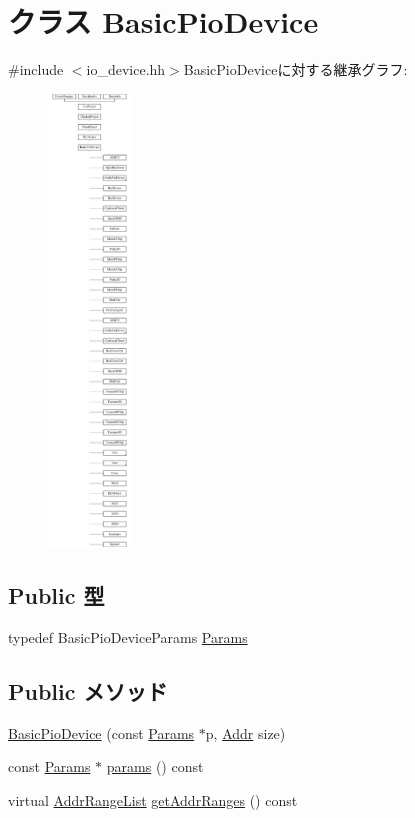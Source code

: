 \hypertarget{classBasicPioDevice}{
\section{クラス BasicPioDevice}
\label{classBasicPioDevice}
}


{\ttfamily \#include $<$io\_\-device.hh$>$}BasicPioDeviceに対する継承グラフ:\begin{figure}[H]
\begin{center}
\leavevmode
\includegraphics[height=12cm]{classBasicPioDevice}
\end{center}
\end{figure}
\subsection*{Public 型}
\begin{DoxyCompactItemize}
\item 
typedef BasicPioDeviceParams \hyperlink{classBasicPioDevice_a2845515ac6467f10540747053c8a0449}{Params}
\end{DoxyCompactItemize}
\subsection*{Public メソッド}
\begin{DoxyCompactItemize}
\item 
\hyperlink{classBasicPioDevice_acd907d772eed45afbc723fd39de00481}{BasicPioDevice} (const \hyperlink{classBasicPioDevice_a2845515ac6467f10540747053c8a0449}{Params} $\ast$p, \hyperlink{base_2types_8hh_af1bb03d6a4ee096394a6749f0a169232}{Addr} size)
\item 
const \hyperlink{classBasicPioDevice_a2845515ac6467f10540747053c8a0449}{Params} $\ast$ \hyperlink{classBasicPioDevice_acd3c3feb78ae7a8f88fe0f110a718dff}{params} () const 
\item 
virtual \hyperlink{classstd_1_1list}{AddrRangeList} \hyperlink{classBasicPioDevice_a36cf113d5e5e091ebddb32306c098fae}{getAddrRanges} () const 
\end{DoxyCompactItemize}
